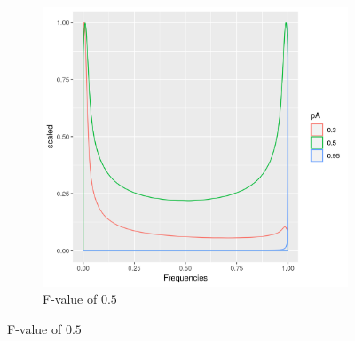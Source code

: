 \documentclass[a4paper, 11pt]{article}
\begin{document}
\begin{figure}
\begin{subfigure}
\end{subfigure}
\begin{subfigure}
\centering
\caption{F-value of $0.5$}
\includegraphics[scale=0.5]{rbeta_plot_05}
\end{subfigure}
\end{figure}
\end{document}
